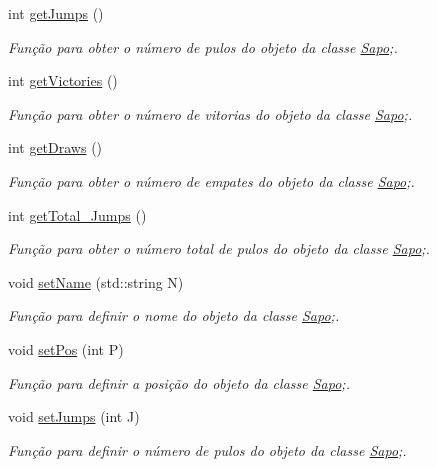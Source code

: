 \begin{DoxyCompactItemize}
int \mbox{\hyperlink{class_sapo_aad9cfa6f83b9e31c677bca925d03a48f}{get\+Jumps}} ()
\begin{DoxyCompactList}\small\item\em Função para obter o número de pulos do objeto da classe \mbox{\hyperlink{class_sapo}{Sapo}};. \end{DoxyCompactList}\item 
int \mbox{\hyperlink{class_sapo_a43fa127a1d4524632ee117b2648e4508}{get\+Victories}} ()
\begin{DoxyCompactList}\small\item\em Função para obter o número de vitorias do objeto da classe \mbox{\hyperlink{class_sapo}{Sapo}};. \end{DoxyCompactList}\item 
int \mbox{\hyperlink{class_sapo_a722d213db7c110e81ee571b6498023ce}{get\+Draws}} ()
\begin{DoxyCompactList}\small\item\em Função para obter o número de empates do objeto da classe \mbox{\hyperlink{class_sapo}{Sapo}};. \end{DoxyCompactList}\item 
int \mbox{\hyperlink{class_sapo_a5cf904ad7ff69d664fa44f7b7305c434}{get\+Total\+\_\+\+Jumps}} ()
\begin{DoxyCompactList}\small\item\em Função para obter o número total de pulos do objeto da classe \mbox{\hyperlink{class_sapo}{Sapo}};. \end{DoxyCompactList}\item 
void \mbox{\hyperlink{class_sapo_a1e83bf88e977ea3271afece7751b7221}{set\+Name}} (std\+::string N)
\begin{DoxyCompactList}\small\item\em Função para definir o nome do objeto da classe \mbox{\hyperlink{class_sapo}{Sapo}};. \end{DoxyCompactList}\item 
void \mbox{\hyperlink{class_sapo_a3be8291d7fa538aa52e6c6a133986845}{set\+Pos}} (int P)
\begin{DoxyCompactList}\small\item\em Função para definir a posição do objeto da classe \mbox{\hyperlink{class_sapo}{Sapo}};. \end{DoxyCompactList}\item 
void \mbox{\hyperlink{class_sapo_a3a1c9bc7901bc6e85ec60d406be2f081}{set\+Jumps}} (int J)
\begin{DoxyCompactList}\small\item\em Função para definir o número de pulos do objeto da classe \mbox{\hyperlink{class_sapo}{Sapo}};. \end{DoxyCompactList}\item 

\end{DoxyCompactItemize}
